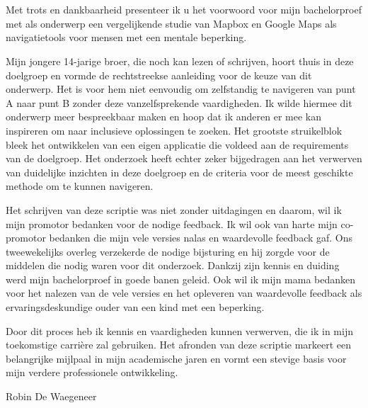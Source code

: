 
\chapter*{}%
\label{ch:voorwoord}



Met trots en dankbaarheid presenteer ik u het voorwoord voor mijn bachelorproef met als onderwerp een vergelijkende studie van Mapbox en Google Maps als navigatietools voor mensen met een mentale beperking. 

Mijn jongere 14-jarige broer, die noch kan lezen of schrijven, hoort thuis in deze doelgroep en vormde de rechtstreekse aanleiding voor de keuze van dit onderwerp. Het is voor hem niet eenvoudig om zelfstandig te navigeren van punt A naar punt B zonder deze vanzelfsprekende vaardigheden. Ik wilde hiermee dit onderwerp meer bespreekbaar maken en hoop dat ik anderen er mee kan inspireren om naar inclusieve oplossingen te zoeken. Het grootste struikelblok bleek het ontwikkelen van een eigen applicatie die voldeed aan de requirements van de doelgroep. Het onderzoek heeft echter zeker bijgedragen aan het verwerven van duidelijke inzichten in deze doelgroep en de criteria voor de meest geschikte methode om te kunnen navigeren. 

Het schrijven van deze scriptie was niet zonder uitdagingen en daarom, wil ik mijn promotor bedanken voor de nodige feedback. Ik wil ook van harte mijn co-promotor bedanken die mijn vele versies nalas en waardevolle feedback gaf. Ons tweewekelijks overleg verzekerde de nodige bijsturing en hij zorgde voor de middelen die nodig waren voor dit onderzoek. Dankzij zijn kennis en duiding werd mijn bachelorproef in goede banen geleid. Ook wil ik mijn mama bedanken voor het nalezen van de vele versies en het opleveren van waardevolle feedback als ervaringsdeskundige ouder van een kind met een beperking.

Door dit proces heb ik kennis en vaardigheden kunnen verwerven, die ik in mijn toekomstige carrière zal gebruiken. Het afronden van deze scriptie markeert een belangrijke mijlpaal in mijn academische jaren en vormt een stevige basis voor mijn verdere professionele ontwikkeling.

Robin De Waegeneer
